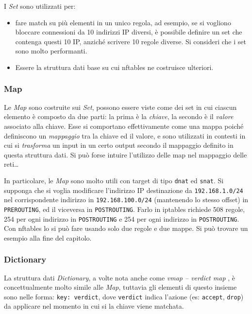 I \textit{Set} sono utilizzati per:
\begin{itemize}
	\item fare match su più elementi in un unico regola, ad esempio, se si vogliono
	      bloccare connessioni da 10 indirizzi IP diversi, è possibile definire un set
	      che contenga questi 10 IP, anziché scrivere 10 regole diverse. Si consideri che
	      i set sono molto performanti.
	\item Essere la struttura dati base su cui nftables ne costruisce ulteriori.
\end{itemize}


\subsubsection{Map}
Le \textit{Map} sono costruite sui \textit{Set}, possono essere viste come dei set in cui
ciascun elemento è composto da due parti: la prima
è la \textit{chiave}, la secondo è il \textit{valore} associato alla chiave. Esse
si comportano effettivamente come una mappa poiché definiscono un \textit{mappaggio}
tra la chiave ed il valore, e sono utilizzati in contesti in cui si \textit{trasforma}
un input in un certo output secondo il mappaggio definito in questa struttura dati.
Si può forse intuire l'utilizzo delle map nel mappaggio delle reti\ldots


In particolare, le \textit{Map} sono molto utili con target di tipo \texttt{dnat} ed \texttt{snat}.
Si supponga che si voglia modificare l'indirizzo IP destinazione da \texttt{192.168.1.0/24}
nel corrispondente indirizzo in \texttt{192.168.100.0/24} (mantenendo lo stesso
offset) in \texttt{PREROUTING}, ed il viceversa in \texttt{POSTROUTING}. Farlo in iptables
richiede 508 regole, 254 per ogni indirizzo in
\texttt{POSTROUTING} e 254 per ogni indirizzo in \texttt{POSTROUTING}. Con nftables
lo si può fare usando solo due regole e due mappe. Si può trovare un esempio alla fine del
capitolo.


\subsubsection{Dictionary}
La struttura dati \textit{Dictionary}, a volte nota anche come \textit{vmap -- verdict map}
, è concettualmente
molto simile alle \textit{Map}, tuttavia gli elementi di questo insieme sono nelle forma:
\texttt{key: verdict}, dove \texttt{verdict} indica l'azione (es: \texttt{accept}, \texttt{drop})
da applicare nel
momento in cui si la chiave viene
matchata.

